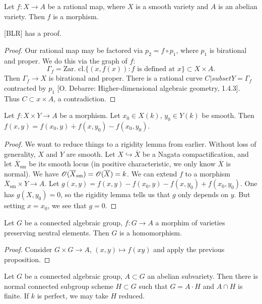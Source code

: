 \begin{theo}
Let $f:X\to A$ be a rational map, where $X$ is a smooth variety and $A$ is an 
abelian variety. Then $f$ is a morphism. 
\end{theo}

[BLR] has a proof. 

\begin{proof}
Our rational map may be factored via $p_2=f\circ p_1$, where $p_1$ is 
birational and proper. We do this via the graph of $f$:
\[
  \Gamma_f = \text{Zar. cl.}\{(x,f(x)):f\text{ is defined at }x\}\subset X\times A .
\]
Then $\Gamma_f \to X$ is birational and proper. There is a rational curve 
$C|subset Y=\Gamma_f$ contracted by $p_1$ [O. Debarre: Higher-dimensional 
algebraic geometry, 1.4.3]. Thus $C\subset x\times A$, a contradiction. 
\end{proof}

\begin{prop}
Let $f:X\times Y\to A$ be a morphism. Let $x_0\in X(k)$, $y_0\in Y(k)$ be 
smooth. Then $f(x,y)=f(x_0,y) + f(x,y_0) - f(x_0,y_0)$. 
\end{prop}
\begin{proof}
We want to reduce things to a rigidity lemma from earlier. Without loss of 
generality, $X$ and $Y$ are smooth. Let 
$X\hookrightarrow \overline X$ be a Nagata compactification, and let 
$\overline{X}_\mathrm{sm}$ be its smooth locus (in positive characteristic, 
we only know $\overline X$ is normal). We have 
$\mathscr{O}(\overline X_\mathrm{sm}) = \mathscr{O}(\overline X)=k$. We can extend $f$ to a 
morphism $\overline X_\mathrm{sm} \times Y \to A$. Let 
$g(x,y) = f(x,y)-f(x_0,y)-f(x,y_0) + f(x_0,y_0)$. One has 
$g(X,y_0) = 0$, so the rigidity lemma tells us that $g$ only depends on $y$. 
But setting $x=x_0$, we see that $g=0$. 
\end{proof}

\begin{coro}
Let $G$ be a connected algebraic group, $f:G\to A$ a morphim of varieties 
preserving neutral elements. Then $G$ is a homomorphism. 
\end{coro}
\begin{proof}
Consider $G\times G\to A$, $(x,y)\mapsto f(x y)$ and apply the previous 
proposition. 
\end{proof}

\begin{theo}[Rosenlicht]
Let $G$ be a connected algebraic group, $A\subset G$ an abelian subvariety. Then 
there is normal connected subgroup scheme $H\subset G$ such that 
$G=A\cdot H$ and $A\cap H$ is finite. If $k$ is perfect, we may take $H$ 
reduced. 
\end{theo}

